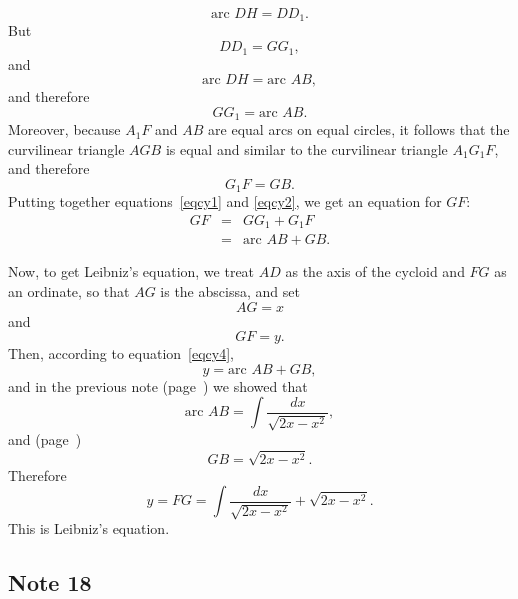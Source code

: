\documentclass[twoside,openright]{article}
\begin{document}
$$\mbox{arc }DH = DD_1.$$
But 
$$DD_1 = GG_1,$$
and 
$$\mbox{arc }DH = \mbox{arc }AB,$$
and therefore
\begin{equation}
GG_1 = \mbox{arc }AB.\label{eqcy1}
\end{equation}
Moreover, because $A_1F$ and $AB$ are equal arcs on equal circles, it
follows that the curvilinear triangle $AGB$ is equal and similar to
the curvilinear triangle $A_1G_1F$, and therefore
\begin{equation}
G_1F = GB.\label{eqcy2}
\end{equation}
Putting together equations~\ref{eqcy1} and \ref{eqcy2}, we get an equation for $GF$:
\begin{eqnarray}
GF & = & GG_1 + G_1F\label{eqcy3}\\
& = & \mbox{arc }AB + GB.\label{eqcy4}
\end{eqnarray}

Now, to get Leibniz's equation, we treat $AD$ as the axis of the
cycloid and $FG$ as an ordinate, so that $AG$ is the abscissa, and set
$$AG = x$$ and
$$GF =y.$$
Then, according to equation~\ref{eqcy4},
$$y = \mbox{arc }AB + GB,$$
and in the previous note (page~\pageref{ecircarc}) we showed that 
$$\mbox{arc }AB = \int\!\frac{dx}{\sqrt{2x -x^2}},$$
and (page~\pageref{sinelength})
$$GB = \sqrt{2x-x^2}.$$
Therefore
$$y = FG = \int\!\frac{dx}{\sqrt{2x -x^2}} + \sqrt{2x-x^2}.$$
This is Leibniz's equation. \label{ecycloid}

\subsection*{Note 18}
\label{crg18}
\end{document}
